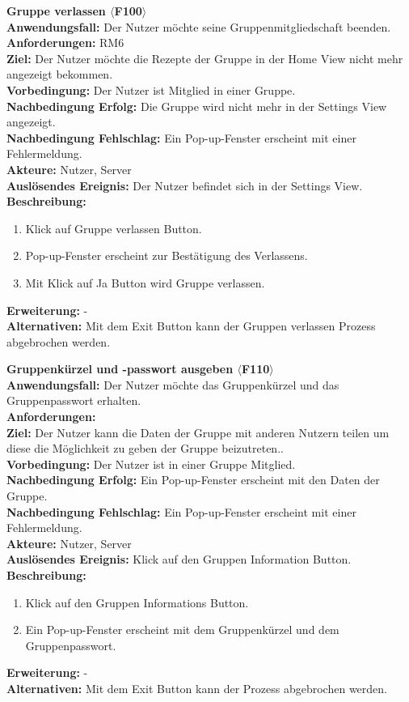 \documentclass[parskip=full]{scrartcl}
\begin{document}
\textbf{Gruppe verlassen $\langle$F100$\rangle$}\\
\textbf{Anwendungsfall:} Der Nutzer möchte seine Gruppenmitgliedschaft beenden.\\
\textbf{Anforderungen:} RM6\\
\textbf{Ziel:} Der Nutzer möchte die Rezepte der Gruppe in der Home View nicht mehr angezeigt bekommen.\\
\textbf{Vorbedingung:} Der Nutzer ist Mitglied in einer Gruppe. \\
\textbf{Nachbedingung Erfolg:} Die Gruppe wird nicht mehr in der Settings View angezeigt.\\
\textbf{Nachbedingung Fehlschlag:} Ein Pop-up-Fenster erscheint mit einer Fehlermeldung.\\
\textbf{Akteure:} Nutzer, Server\\
\textbf{Auslösendes Ereignis:} Der Nutzer befindet sich in der Settings View.\\
\textbf{Beschreibung:}
\begin{enumerate}
    \item Klick auf Gruppe verlassen Button.
    \item Pop-up-Fenster erscheint zur Bestätigung des Verlassens.
    \item Mit Klick auf Ja Button wird Gruppe verlassen.
\end{enumerate}
\textbf{Erweiterung:} -\\
\textbf{Alternativen:} Mit dem Exit Button kann der Gruppen verlassen Prozess abgebrochen werden.\\
\newpage

\textbf{Gruppenkürzel und -passwort ausgeben $\langle$F110$\rangle$}\\
\textbf{Anwendungsfall:}  Der Nutzer möchte das Gruppenkürzel und das Gruppenpasswort erhalten.\\
\textbf{Anforderungen:} \\
\textbf{Ziel:} Der Nutzer kann die Daten der Gruppe mit anderen Nutzern teilen um diese die Möglichkeit zu geben der Gruppe beizutreten..\\
\textbf{Vorbedingung:} Der Nutzer ist in einer Gruppe Mitglied.\\
\textbf{Nachbedingung Erfolg:} Ein Pop-up-Fenster erscheint mit den Daten der Gruppe.\\
\textbf{Nachbedingung Fehlschlag:} Ein Pop-up-Fenster erscheint mit einer Fehlermeldung.\\
\textbf{Akteure:} Nutzer, Server \\
\textbf{Auslösendes Ereignis:} Klick auf den Gruppen Information Button.\\
\textbf{Beschreibung:}
\begin{enumerate}
    \item Klick auf den Gruppen Informations Button.
    \item Ein Pop-up-Fenster erscheint mit dem Gruppenkürzel und dem Gruppenpasswort.
\end{enumerate}
\textbf{Erweiterung:} -\\
\textbf{Alternativen:} Mit dem Exit Button kann der Prozess abgebrochen werden.\\
\newpage
\end{document}
